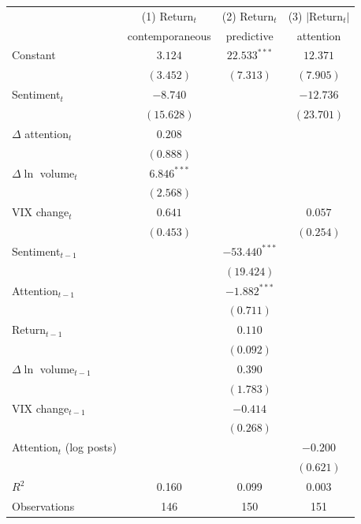 \begin{tabular}{lccc}
\toprule
 & (1) Return$_t$ & (2) Return$_t$ & (3) $|$Return$_t|$ \\
 & contemporaneous & predictive & attention \\
\midrule
Constant & $3.124$ & $22.533^{***}$ & $12.371$ \\
 & $(3.452)$ & $(7.313)$ & $(7.905)$ \\
Sentiment$_t$ & $-8.740$ &  & $-12.736$ \\
 & $(15.628)$ &  & $(23.701)$ \\
$\Delta$ attention$_t$ & $0.208$ &  &  \\
 & $(0.888)$ &  &  \\
$\Delta\ln$ volume$_t$ & $6.846^{***}$ &  &  \\
 & $(2.568)$ &  &  \\
VIX change$_t$ & $0.641$ &  & $0.057$ \\
 & $(0.453)$ &  & $(0.254)$ \\
Sentiment$_{t-1}$ &  & $-53.440^{***}$ &  \\
 &  & $(19.424)$ &  \\
Attention$_{t-1}$ &  & $-1.882^{***}$ &  \\
 &  & $(0.711)$ &  \\
Return$_{t-1}$ &  & $0.110$ &  \\
 &  & $(0.092)$ &  \\
$\Delta\ln$ volume$_{t-1}$ &  & $0.390$ &  \\
 &  & $(1.783)$ &  \\
VIX change$_{t-1}$ &  & $-0.414$ &  \\
 &  & $(0.268)$ &  \\
Attention$_t$ (log posts) &  &  & $-0.200$ \\
 &  &  & $(0.621)$ \\
\midrule
$R^2$ & 0.160 & 0.099 & 0.003 \\
Observations & 146 & 150 & 151 \\
\bottomrule
\end{tabular}
